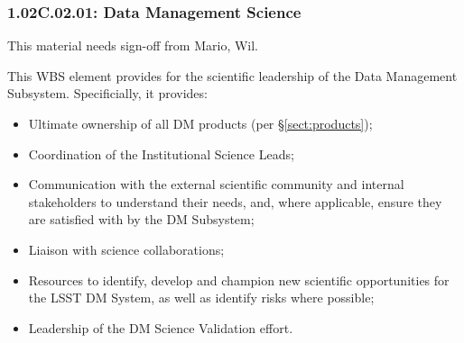 \subsubsection*{1.02C.02.01: Data Management Science}

\begin{note}
This material needs sign-off from Mario, Wil.
\end{note}

This WBS element provides for the scientific leadership of the Data Management
Subsystem. Specificially, it provides:

\begin{itemize}

  \item{Ultimate ownership of all DM products (per \S\ref{sect:products});}

  \item{Coordination of the Institutional Science Leads;}

  \item{Communication with the external scientific community and internal
  stakeholders to understand their needs, and, where applicable, ensure they
  are satisfied with by the DM Subsystem;}

  \item{Liaison with science collaborations;}

  \item{Resources to identify, develop and champion new scientific
  opportunities for the LSST DM System, as well as identify risks where
  possible;}

  \item{Leadership of the DM Science Validation effort.}

\end{itemize}
